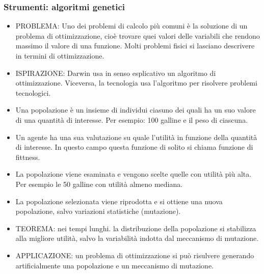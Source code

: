 \documentclass[xcolor=svgnames]{beamer}
\begin{document}
\begin{frame}\small\frametitle{Strumenti: algoritmi genetici}

  \begin{itemize}
    \item PROBLEMA: Uno dei problemi di calcolo più comuni è la soluzione di un problema di ottimizzazione, cioè trovare quei valori delle variabili che rendono massimo il valore di una funzione. Molti problemi fisici si lasciano descrivere in termini di ottimizzazione.
\item ISPIRAZIONE: Darwin usa in senso esplicativo un algoritmo di ottimizzazione. Viceversa, la tecnologia usa l'algoritmo per risolvere problemi tecnologici.
  \item Una popolazione è un insieme di individui ciasuno dei quali ha un suo valore di una quantità di interesse. Per esempio: 100 galline e il peso di ciascuna.
  \item Un agente ha una sua valutazione su quale l'utilità in funzione della quantità di interesse. In questo campo questa funzione di solito si chiama funzione di fittness.
  \item La popolazione viene esaminata e vengono scelte quelle con utilità più alta. Per esempio le 50 galline con utilità almeno mediana.
  \item La popolazione selezionata viene riprodotta e si ottiene una nuova popolazione, salvo variazioni statistiche (mutazione).
  \item TEOREMA: nei tempi lunghi. la distribuzione della popolazione si stabilizza alla migliore utilità, salvo la variabilità indotta dal meccanismo di mutazione.
    \item APPLICAZIONE: un problema di ottimizzazione si può risulvere generando artificialmente una popolazione e un meccanismo di mutazione.
  \end{itemize}
\end{frame}
\end{document}
